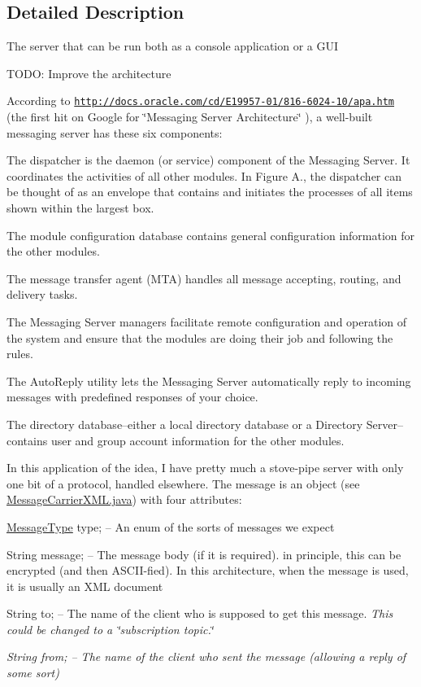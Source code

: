 \subsection{Detailed Description}
The server that can be run both as a console application or a G\-U\-I

T\-O\-D\-O\-: Improve the architecture

According to \href{http://docs.oracle.com/cd/E19957-01/816-6024-10/apa.htm}{\tt http\-://docs.\-oracle.\-com/cd/\-E19957-\/01/816-\/6024-\/10/apa.\-htm} (the first hit on Google for \char`\"{}\-Messaging Server Architecture\char`\"{} ), a well-\/built messaging server has these six components\-: 
\begin{DoxyItemize}
\item The dispatcher is the daemon (or service) component of the Messaging Server. It coordinates the activities of all other modules. In Figure A., the dispatcher can be thought of as an envelope that contains and initiates the processes of all items shown within the largest box. 
\item The module configuration database contains general configuration information for the other modules. 
\item The message transfer agent (M\-T\-A) handles all message accepting, routing, and delivery tasks. 
\item The Messaging Server managers facilitate remote configuration and operation of the system and ensure that the modules are doing their job and following the rules. 
\item The Auto\-Reply utility lets the Messaging Server automatically reply to incoming messages with predefined responses of your choice. 
\item The directory database--either a local directory database or a Directory Server--contains user and group account information for the other modules. 
\end{DoxyItemize}

In this application of the idea, I have pretty much a stove-\/pipe server with only one bit of a protocol, handled elsewhere. The message is an object (see \hyperlink{MessageCarrierXML_8java}{Message\-Carrier\-X\-M\-L.\-java}) with four attributes\-: 
\begin{DoxyItemize}
\item \hyperlink{enumgov_1_1fnal_1_1ppd_1_1dd_1_1chat_1_1MessageType}{Message\-Type} type; -- An enum of the sorts of messages we expect 
\item String message; -- The message body (if it is required). in principle, this can be encrypted (and then A\-S\-C\-I\-I-\/fied). In this architecture, when the message is used, it is usually an X\-M\-L document 
\item String to; -- The name of the client who is supposed to get this message. {\itshape This could be changed to a {\itshape \char`\"{}subscription topic.\char`\"{}} }
\item {\itshape String from; -- The name of the client who sent the message (allowing a reply of some sort) }
\end{DoxyItemize}

